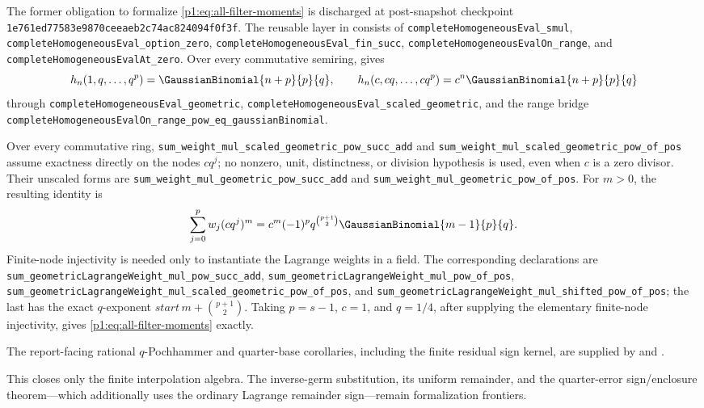 \documentclass[11pt,oneside]{article}
\numberwithin{equation}{section}
\theoremstyle{definition}
\theoremstyle{remark}
\begin{document}
\begin{remark}
The former obligation to formalize \eqref{p1:eq:all-filter-moments} is discharged
at post-snapshot checkpoint
\nolinkurl{1e761ed77583e9870ceeaeb2c74ac824094f0f3f}.  The reusable layer in
 consists of
\nolinkurl{completeHomogeneousEval_smul},
\nolinkurl{completeHomogeneousEval_option_zero},
\nolinkurl{completeHomogeneousEval_fin_succ},
\nolinkurl{completeHomogeneousEvalOn_range}, and
\nolinkurl{completeHomogeneousEvalAt_zero}.  Over every commutative semiring,
 gives
\[
 h_n(1,q,\ldots,q^p)=\GaussianBinomial{n+p}{p}{q},
 \qquad
 h_n(c,cq,\ldots,cq^p)=c^n\GaussianBinomial{n+p}{p}{q}
\]
through \nolinkurl{completeHomogeneousEval_geometric},
\nolinkurl{completeHomogeneousEval_scaled_geometric}, and the range bridge
\nolinkurl{completeHomogeneousEvalOn_range_pow_eq_gaussianBinomial}.

Over every commutative ring,
\nolinkurl{sum_weight_mul_scaled_geometric_pow_succ_add} and
\nolinkurl{sum_weight_mul_scaled_geometric_pow_of_pos} assume exactness
directly on the nodes \(c q^j\); no nonzero, unit, distinctness, or division
hypothesis is used, even when \(c\) is a zero divisor.  Their unscaled forms
are \nolinkurl{sum_weight_mul_geometric_pow_succ_add} and
\nolinkurl{sum_weight_mul_geometric_pow_of_pos}.  For \(m>0\), the resulting
identity is
\[
 \sum_{j=0}^{p}w_j(cq^j)^m
 =c^m(-1)^p q^{\binom{p+1}{2}}\GaussianBinomial{m-1}{p}{q}.
\]
Finite-node injectivity is needed only to instantiate the Lagrange weights in
a field.  The corresponding declarations are
\nolinkurl{sum_geometricLagrangeWeight_mul_pow_succ_add},
\nolinkurl{sum_geometricLagrangeWeight_mul_pow_of_pos},
\nolinkurl{sum_geometricLagrangeWeight_mul_scaled_geometric_pow_of_pos}, and
\nolinkurl{sum_geometricLagrangeWeight_mul_shifted_pow_of_pos}; the last has
the exact \(q\)-exponent
\(start\,m+\binom{p+1}{2}\).  Taking \(p=s-1\), \(c=1\), and \(q=1/4\), after
supplying the elementary finite-node injectivity, gives
\eqref{p1:eq:all-filter-moments} exactly.

The report-facing rational \(q\)-Pochhammer and quarter-base corollaries,
including the finite residual sign kernel, are supplied by
 and
.

This closes only the finite interpolation algebra.  The inverse-germ
substitution, its uniform remainder, and the quarter-error sign/enclosure
theorem---which additionally uses the ordinary Lagrange remainder
sign---remain formalization frontiers.
\end{remark}
\end{document}
